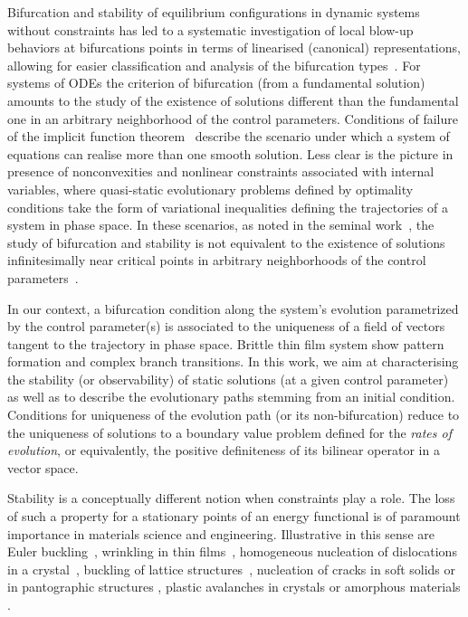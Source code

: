 Bifurcation and stability of equilibrium configurations in dynamic systems without constraints has led to a systematic investigation of local blow-up behaviors at bifurcations points in terms of linearised (canonical) representations, allowing for easier classification and analysis of the bifurcation types~\cite{Iooss2012-el}. 
For systems of ODEs the criterion  of bifurcation (from a fundamental solution) amounts to the study of the existence of solutions different than the fundamental one in an arbitrary neighborhood of the control parameters. Conditions of failure of the implicit function theorem~\cite{Iooss2012-el} describe the scenario under which a system of equations can realise more than one smooth solution.
Less clear is the picture in presence of nonconvexities and nonlinear constraints associated with internal variables, where quasi-static evolutionary problems defined by optimality conditions take the form of variational inequalities defining the trajectories of a system in phase space. In these scenarios, as noted in the seminal work~\cite{Hill1958-xd}, the study of bifurcation and stability is not equivalent to the existence of solutions infinitesimally near critical points in arbitrary neighborhoods of the control parameters~\cite{Bazant2010-zb}.

In our context, 
a bifurcation condition along the system's evolution parametrized by the control parameter(s) is associated to the uniqueness of a field of vectors tangent to the trajectory in phase space.
Brittle thin film system show pattern formation and complex branch transitions. In this work, we aim at characterising the stability (or observability) of static solutions (at a given control parameter) as well as to describe the evolutionary paths stemming from an initial condition. Conditions for uniqueness of the evolution path (or its non-bifurcation) reduce to the uniqueness of solutions to a boundary value problem defined for the \emph{rates of evolution}, or equivalently, the positive definiteness of its bilinear operator in a vector space.

Stability is a conceptually different notion when constraints play a role.
The loss of such a property for a stationary points of an energy functional is of paramount importance in materials science and engineering. Illustrative in this sense are Euler buckling~\cite{Bettiol2020-ey}, wrinkling in thin films~\cite{Hutchinson2013-jk}, homogeneous nucleation of dislocations in a crystal~\cite{Carpio2005-bv,Plans2007-cx,Baggio2019-rs,Mayer2022-km,Baggio2023-qu}, buckling of lattice structures~\cite{Combescure2016-dy,Bertoldi2008-au}, nucleation of cracks in soft solids or in pantographic structures \cite{Riccobelli2023-fc,Salman2021-mn}, plastic  avalanches in crystals or amorphous materials \cite{Zhang2020-ax,Weiss2021-db,Yang2020-zm}.

